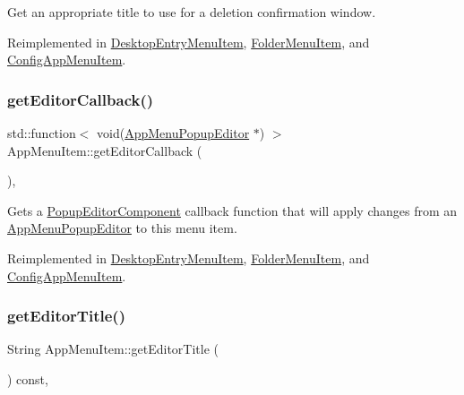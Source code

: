 Get an appropriate title to use for a deletion confirmation window. 

Reimplemented in \mbox{\hyperlink{classDesktopEntryMenuItem_a4ec791310ca94a2e9e5d3fab24656502}{Desktop\+Entry\+Menu\+Item}}, \mbox{\hyperlink{classFolderMenuItem_ab3a7232acdc84681c8c31113383471ad}{Folder\+Menu\+Item}}, and \mbox{\hyperlink{classConfigAppMenuItem_a7fa58af5cacd6c4dbd891a959efe1c07}{Config\+App\+Menu\+Item}}.

\mbox{\label{classAppMenuItem_af742017ff127e5f36da1e206205c86ee}} 
\subsubsection{\texorpdfstring{get\+Editor\+Callback()}{getEditorCallback()}}
{\footnotesize\ttfamily std\+::function$<$ void(\mbox{\hyperlink{classAppMenuPopupEditor}{App\+Menu\+Popup\+Editor}} $\ast$) $>$ App\+Menu\+Item\+::get\+Editor\+Callback (\begin{DoxyParamCaption}{ }\end{DoxyParamCaption})\hspace{0.3cm}{\ttfamily [protected]}, {\ttfamily [virtual]}}

Gets a \mbox{\hyperlink{classPopupEditorComponent}{Popup\+Editor\+Component}} callback function that will apply changes from an \mbox{\hyperlink{classAppMenuPopupEditor}{App\+Menu\+Popup\+Editor}} to this menu item. 

Reimplemented in \mbox{\hyperlink{classDesktopEntryMenuItem_a5f32e4ceb94436758097c546aa22928f}{Desktop\+Entry\+Menu\+Item}}, \mbox{\hyperlink{classFolderMenuItem_a165416374f830311c0881b568922f9f5}{Folder\+Menu\+Item}}, and \mbox{\hyperlink{classConfigAppMenuItem_a82c1db45a09f0997b9f8802a3729972a}{Config\+App\+Menu\+Item}}.

\mbox{\label{classAppMenuItem_a4f0501780311afb7630d99b9e84a5c9d}} 
\subsubsection{\texorpdfstring{get\+Editor\+Title()}{getEditorTitle()}}
{\footnotesize\ttfamily String App\+Menu\+Item\+::get\+Editor\+Title (\begin{DoxyParamCaption}{ }\end{DoxyParamCaption}) const\hspace{0.3cm}{\ttfamily [protected]}, {\ttfamily [virtual]}}

